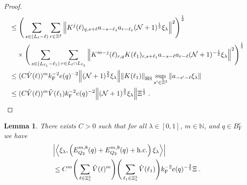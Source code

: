 \documentclass[12pt,a4paper]{article}
\numberwithin{equation}{section}
\newcommand{\NNN}{\mathbb{N}}
\newcommand{\1}{\mathbb{I}}
\newcommand{\F}{\mathrm{F}}
\newcommand{\HS}{\mathrm{HS}}
\newcommand{\Z}{\mathbb{Z}}
\newcommand{\NN}{\mathcal{N}}
\newcommand{\half}{\frac{1}{2}}
\newcommand{\eva}[1]{\left\langle #1 \right\rangle}
\theoremstyle{plain}
\newtheorem{lemma}[theorem]{Lemma}
\theoremstyle{definition}
\theoremstyle{remark}
\theoremstyle{plain}
\theoremstyle{definition}
\theoremstyle{remark}
\begin{document}
\begin{proof}
\begin{align}
	&\leq \Bigg( \sum_{ s \in (L_{\ell}-\ell) } \sum_{r\in \Z^3} \norm{ K^{j}(\ell)_{q,s+\ell} a_{-s-\ell_1} a_{r-\ell_1} (\NN+1)^{\half} \xi_\lambda}^2\Bigg)^\half\nonumber \\
		&\quad \times\Bigg( \sum_{ s \in (L_{\ell_1}-\ell_1)} \sum_{ r\in L_{\ell} \cap L_{\ell_1}}
		\norm{ K^{m-j}(\ell)_{r,q} K(\ell_1)_{r,s+\ell_1} a_{-s-\ell}a_{r-\ell} (\NN+1)^{-\half} \xi_\lambda }^2\Bigg)^\half \nonumber\\
	&\leq (C \hat{V}(\ell))^m k_{\F}^{-2} e(q)^{-2} 
		\norm{(\NN+1)^{\frac 32} \xi_\lambda}
		\norm{K(\ell_1)}_{\HS}
		\sup_{s' \in \Z^3} \norm{ a_{-s'-\ell} \xi_\lambda } \nonumber \\
	&\leq (C \hat{V}(\ell))^m \hat{V}(\ell_1) k_{\F}^{-2} e(q)^{-2}
		\norm{(\NN+1)^{\frac 32} \xi_\lambda} \Xi^{\half} \;. \qedhere \nonumber
\end{align} 
\end{proof}


\begin{lemma} \label{lem:EQ218}
There exists $ C > 0 $ such that for all $ \lambda \in [0,1] $, $ m \in \NNN $, and $ q \in B_{\F}^c $ we have
\begin{align}\label{eq:estEQ218}
\begin{split}
	& \abs{\eva{\xi_\lambda,\left(E^{m,8}_{Q_2}(q) + E^{m,9}_{Q_2}(q) + \mathrm{h.c.}\right) \xi_\lambda }} \\
&	\leq C^m \Bigg(\sum_{\ell \in \Z^3_*} \hat{V}(\ell)^m \Bigg)
		\Bigg(\sum_{\ell_1 \in \Z^3_*} \hat{V}(\ell_1) \Bigg)
		k_{\F}^{-2} e(q)^{-\frac 32} \Xi \;.
\end{split}
\end{align}
\end{lemma}
\end{document}
